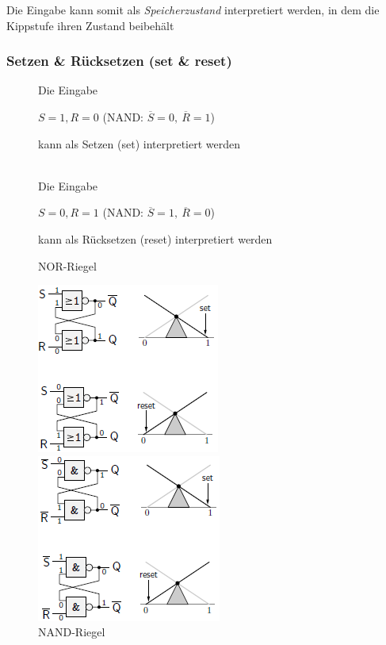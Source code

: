 \documentclass[12pt]{report}
\begin{document}
Die Eingabe kann somit als \textit{Speicherzustand} interpretiert werden, 
in dem die Kippstufe ihren Zustand beibehält

\subsubsection{Setzen \& Rücksetzen (set \& reset)}

\begin{figure}[H]
  \begin{minipage}[t]{0.45\textwidth}
    \centering
    Die Eingabe

    $S=1, R=0$ (NAND: $\overline{S} = 0,\ \overline{R} = 1$)

    kann als Setzen (set) interpretiert werden \\ \ 
  \end{minipage}
  \hfill
  \begin{minipage}[t]{0.45\textwidth}
    \centering
    Die Eingabe 

    $S=0, R=1$ (NAND: $\overline{S} = 1,\ \overline{R} = 0$) 

    kann als Rücksetzen (reset) interpretiert werden
  \end{minipage}
\end{figure}


\begin{figure}[H]
  \begin{minipage}[t]{0.48\textwidth}
    \caption{NOR-Riegel}
    \centering
    \includegraphics{riegel_nor_set_reset}
  \end{minipage}
  \hfill
  \begin{minipage}[t]{0.48\textwidth}
    \caption{NAND-Riegel}
    \centering
    \includegraphics{riegel_nand_set_reset}
  \end{minipage}
\end{figure}
\end{document}
